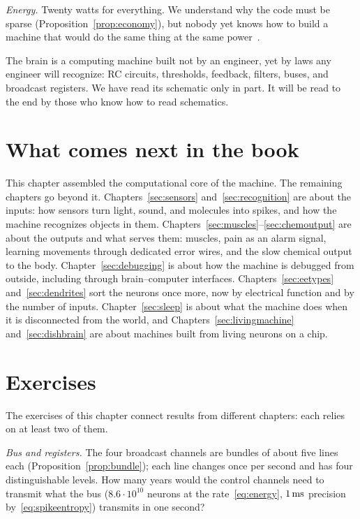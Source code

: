 \emph{Energy.} Twenty watts for everything. We understand why the code must be sparse (Proposition~\ref{prop:economy}), but nobody yet knows how to build a machine that would do the same thing at the same power~\cite{MehonicKenyon2022}.

The brain is a computing machine built not by an engineer, yet by laws any engineer will recognize: RC circuits, thresholds, feedback, filters, buses, and broadcast registers. We have read its schematic only in part. It will be read to the end by those who know how to read schematics.

\section{What comes next in the book}

This chapter assembled the computational core of the machine. The remaining chapters go beyond it. Chapters~\ref{sec:sensors} and~\ref{sec:recognition} are about the inputs: how sensors turn light, sound, and molecules into spikes, and how the machine recognizes objects in them. Chapters~\ref{sec:muscles}--\ref{sec:chemoutput} are about the outputs and what serves them: muscles, pain as an alarm signal, learning movements through dedicated error wires, and the slow chemical output to the body. Chapter~\ref{sec:debugging} is about how the machine is debugged from outside, including through brain--computer interfaces. Chapters~\ref{sec:eetypes} and~\ref{sec:dendrites} sort the neurons once more, now by electrical function and by the number of inputs. Chapter~\ref{sec:sleep} is about what the machine does when it is disconnected from the world, and Chapters~\ref{sec:livingmachine} and~\ref{sec:dishbrain} are about machines built from living neurons on a chip.

\section{Exercises}

The exercises of this chapter connect results from different chapters: each relies on at least two of them.

\begin{exercise}[\lvlA]
\label{ex:10:1}
\emph{Bus and registers.} The four broadcast channels are bundles of about five lines each (Proposition~\ref{prop:bundle}); each line changes once per second and has four distinguishable levels. How many years would the control channels need to transmit what the  bus ($8.6\cdot10^{10}$ neurons at the rate~\eqref{eq:energy}, $1\,\text{ms}$ precision by~\eqref{eq:spikeentropy}) transmits in one second?
\end{exercise}

